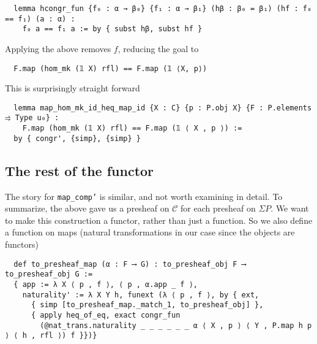 \documentclass{article}
\newcommand{\CC}{\mathcal{C}}
\newcommand{\<}{\langle}
\renewcommand{\>}{\rangle}
\theoremstyle{definitionstyle}
\theoremstyle{exercisestyle}
\theoremstyle{remarkstyle}
\begin{document}
\begin{lstlisting}
  lemma hcongr_fun {f₀ : α → β₀} {f₁ : α → β₁} (hβ : β₀ = β₁) (hf : f₀ == f₁) (a : α) :
    f₀ a == f₁ a := by { subst hβ, subst hf } \end{lstlisting}

Applying the above removes $f$, reducing the goal to
\begin{lstlisting}
  F.map (hom_mk (𝟙 X) rfl) == F.map (𝟙 ⟨X, p⟩) \end{lstlisting}
This is surprisingly straight forward
\begin{lstlisting}
  lemma map_hom_mk_id_heq_map_id {X : C} {p : P.obj X} {F : P.elements ⥤ Type u₀} :
    F.map (hom_mk (𝟙 X) rfl) == F.map (𝟙 ⟨ X , p ⟩) :=
  by { congr', {simp}, {simp} } \end{lstlisting}

\subsection{The rest of the functor}

The story for \texttt{map\_comp'} is similar, and not worth examining in detail.
To summarize,
the above gave us a presheaf on $\CC$ for each presheaf on $\Sigma P$.
We want to make this construction a functor, rather than just a function.
So we also define a function on maps (natural transformations in our case
since the objects are functors)

\begin{lstlisting}
  def to_presheaf_map (α : F ⟶ G) : to_presheaf_obj F ⟶ to_presheaf_obj G :=
  { app := λ X ⟨ p , f ⟩, ⟨ p , α.app _ f ⟩,
    naturality' := λ X Y h, funext (λ ⟨ p , f ⟩, by { ext,
      { simp [to_presheaf_map._match_1, to_presheaf_obj] },
      { apply heq_of_eq, exact congr_fun
        (@nat_trans.naturality _ _ _ _ _ _ α ⟨ X , p ⟩ ⟨ Y , P.map h p ⟩ ⟨ h , rfl ⟩) f }})} \end{lstlisting}
\end{document}
